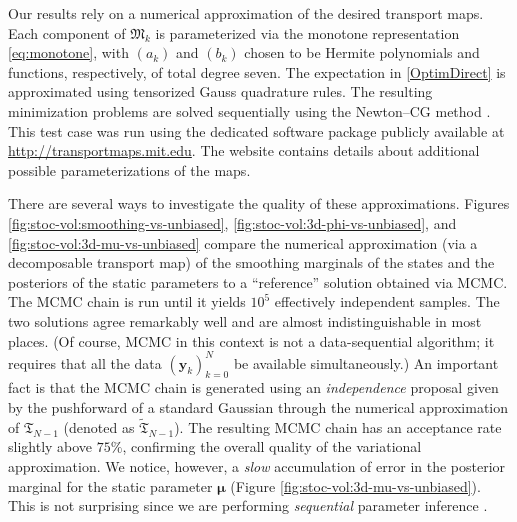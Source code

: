 \documentclass[twoside,11pt]{article}
\newcommand{\yb}{\boldsymbol{y}}
\newcommand{\mub}{\boldsymbol{\mu}}
\begin{document}
Our results rely on a numerical approximation of the
desired transport maps.
Each component of $\mathfrak{M}_k$ is 
parameterized via the monotone representation
\eqref{eq:monotone}, 
%
%
with $(a_k)$ and $(b_k)$ chosen to be Hermite polynomials and functions, respectively, of total degree seven.%
The %
expectation 
in \eqref{OptimDirect} is approximated using tensorized Gauss quadrature 
rules.
%
%
%
%
%
The resulting minimization problems are 
solved sequentially using the Newton--CG method \citep{wright1999numerical}.
This test case was run using the dedicated software package publicly available at
\url{http://transportmaps.mit.edu}.
The website contains details about additional possible parameterizations of the maps.
%
%
%
%
%
%
%
%
%
%
%

There are several ways to investigate the quality of these
approximations.  Figures
\ref{fig:stoc-vol:smoothing-vs-unbiased},
\ref{fig:stoc-vol:3d-phi-vs-unbiased}, and
\ref{fig:stoc-vol:3d-mu-vs-unbiased} 
compare the numerical
approximation (via a decomposable transport map) of the smoothing marginals
of the states and the posteriors of the static parameters to a ``reference'' solution
obtained via MCMC. The MCMC chain is run until it
yields $10^5$ effectively independent samples.  The two solutions 
agree remarkably well and are almost indistinguishable in most
places. 
%
(Of course, MCMC in this context is not a data-sequential
algorithm; it requires that all the data $(\yb_k)_{k = 0}^N$ be
available simultaneously.)
%
An important fact is that the MCMC chain is generated using an 
{\it independence} proposal \citep{robert2013monte} given by the pushforward of a standard Gaussian
through the numerical
approximation of
$\mathfrak{T}_{N-1}$ (denoted as 
$\widetilde{ \mathfrak{T} }_{N-1}$).
The resulting MCMC chain has an acceptance rate slightly above $75 \%$, confirming the
overall quality of the variational approximation.
We notice, however, a {\it slow} accumulation of error in the posterior marginal
for the static parameter $\mub$ (Figure \ref{fig:stoc-vol:3d-mu-vs-unbiased}).
This is not surprising since we are performing {\it sequential} 
parameter inference \citep{jacob2015sequential}. 
\end{document}
